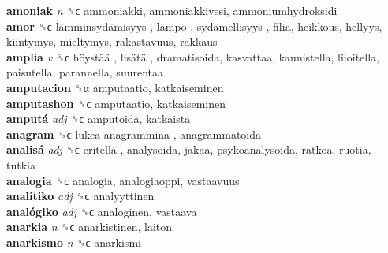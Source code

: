 \textbf{amoniak} \emph{n}  ␝ϲ  ammoniakki, ammoniakkivesi, ammoniumhydroksidi  \\
\textbf{amor} ␝ϲ   lämminsydämisyys ,  lämpö ,  sydämellisyys , filia, heikkous, hellyys, kiintymys, mieltymys, rakastavuus, rakkaus  \\
\textbf{amplia} \emph{v}  ␝ϲ   höystää ,  lisätä , dramatisoida, kasvattaa, kaunistella, liioitella, paisutella, parannella, suurentaa  \\
\textbf{amputacion} ␝α  amputaatio, katkaiseminen  \\
\textbf{amputashon} ␝ϲ  amputaatio, katkaiseminen  \\
\textbf{amputá} \emph{adj}  ␝ϲ  amputoida, katkaista  \\
\textbf{anagram} ␝ϲ   lukea anagrammina , anagrammatoida  \\
\textbf{analisá} \emph{adj}  ␝ϲ   eritellä , analysoida, jakaa, psykoanalysoida, ratkoa, ruotia, tutkia  \\
\textbf{analogia} ␝ϲ  analogia, analogiaoppi, vastaavuus  \\
\textbf{analítiko} \emph{adj}  ␝ϲ  analyyttinen  \\
\textbf{analógiko} \emph{adj}  ␝ϲ  analoginen, vastaava  \\
\textbf{anarkia} \emph{n}  ␝ϲ  anarkistinen, laiton  \\
\textbf{anarkismo} \emph{n}  ␝ϲ  anarkismi  \\
